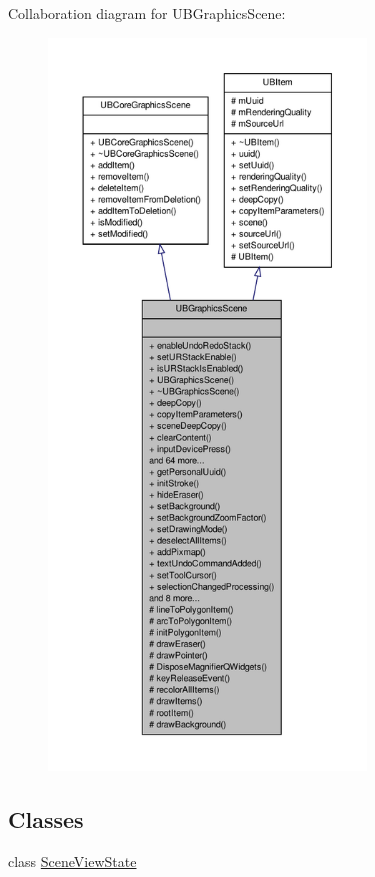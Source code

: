 Collaboration diagram for U\-B\-Graphics\-Scene\-:
\nopagebreak
\begin{figure}[H]
\begin{center}
\leavevmode
\includegraphics[height=550pt]{de/de5/class_u_b_graphics_scene__coll__graph}
\end{center}
\end{figure}
\subsection*{Classes}
\begin{DoxyCompactItemize}
\item 
class \hyperlink{class_u_b_graphics_scene_1_1_scene_view_state}{Scene\-View\-State}
\end{DoxyCompactItemize}
